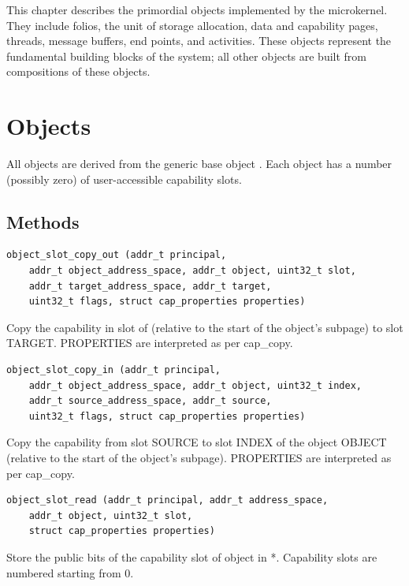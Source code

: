 This chapter describes the primordial objects implemented by the
microkernel.  They include folios, the unit of storage allocation,
data and capability pages, threads, message buffers, end points, and
activities.  These objects represent the fundamental building blocks
of the system; all other objects are built from compositions of these
objects.

\clearpage
\section{Objects}

All objects are derived from the generic base object .
Each object has a number (possibly zero) of user-accessible capability
slots.

\subsection{Methods}

\begin{lstlisting}
object_slot_copy_out (addr_t principal,
    addr_t object_address_space, addr_t object, uint32_t slot,
    addr_t target_address_space, addr_t target,
    uint32_t flags, struct cap_properties properties)
\end{lstlisting}

Copy the capability in slot  of  (relative to
the start of the object's subpage) to slot TARGET.  PROPERTIES are
interpreted as per cap\_copy.

\begin{lstlisting}
object_slot_copy_in (addr_t principal,
    addr_t object_address_space, addr_t object, uint32_t index,
    addr_t source_address_space, addr_t source,
    uint32_t flags, struct cap_properties properties)
\end{lstlisting}

Copy the capability from slot SOURCE to slot INDEX of the object
OBJECT (relative to the start of the object's subpage).  PROPERTIES
are interpreted as per cap\_copy.

\begin{lstlisting}
object_slot_read (addr_t principal, addr_t address_space,
    addr_t object, uint32_t slot,
    struct cap_properties properties)
\end{lstlisting}

Store the public bits of the capability slot  of object
 in *.  Capability slots are numbered
starting from 0.

